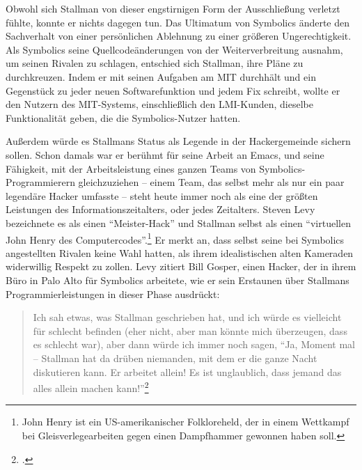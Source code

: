 Obwohl sich Stallman von dieser engstirnigen Form der Ausschließung verletzt fühlte, konnte er nichts dagegen tun. Das Ultimatum von Symbolics änderte den Sachverhalt von einer persönlichen Ablehnung zu einer größeren Ungerechtigkeit. Als Symbolics seine Quellcodeänderungen von der Weiterverbreitung ausnahm, um seinen Rivalen zu schlagen, entschied sich Stallman, ihre Pläne zu durchkreuzen. Indem er mit seinen Aufgaben am MIT durchhält und ein Gegenstück zu jeder neuen Softwarefunktion und jedem Fix schreibt, wollte er den Nutzern des MIT-Systems, einschließlich den LMI-Kunden, dieselbe Funktionalität geben, die die Symbolics-Nutzer hatten.

Außerdem würde es Stallmans Status als Legende in der Hackergemeinde sichern sollen. Schon damals war er berühmt für seine Arbeit an Emacs, und seine Fähigkeit, mit der Arbeitsleistung eines ganzen Teams von Symbolics-Programmierern gleichzuziehen – einem Team, das selbst mehr als nur ein paar legendäre Hacker umfasste – steht heute immer noch als eine der größten Leistungen des Informationszeitalters, oder jedes Zeitalters. Steven Levy bezeichnete es als einen "`Meister-Hack"' und Stallman selbst als einen "`virtuellen John Henry des Computercodes"'.\footnote{John Henry ist ein US-amerikanischer Folkloreheld, der in einem Wettkampf bei Gleisverlegearbeiten gegen einen Dampfhammer gewonnen haben soll.} Er merkt an, dass selbst seine bei Symbolics angestellten Rivalen keine Wahl hatten, als ihrem idealistischen alten Kameraden widerwillig Respekt zu zollen. Levy zitiert Bill Gosper, einen Hacker, der in ihrem Büro in Palo Alto für Symbolics arbeitete, wie er sein Erstaunen über Stallmans Programmierleistungen in dieser Phase ausdrückt:

\begin{quote}
Ich sah etwas, was Stallman geschrieben hat, und ich würde es vielleicht für schlecht befinden (eher nicht, aber man könnte mich überzeugen, dass es schlecht war), aber dann würde ich immer noch sagen, "`Ja, Moment mal – Stallman hat da drüben niemanden, mit dem er die ganze Nacht diskutieren kann. Er arbeitet allein! Es ist unglaublich, dass jemand das alles allein machen kann!"'\footcite[Vgl.][S.\,426]{hackers}
\end{quote}


